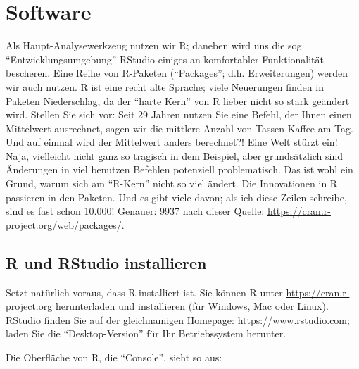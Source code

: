 \documentclass[12pt,]{book}
\begin{document}
\section{Software}\label{software}

Als Haupt-Analysewerkzeug nutzen wir R; daneben wird uns die sog.
``Entwicklungsumgebung'' RStudio einiges an komfortabler Funktionalität
bescheren. Eine Reihe von R-Paketen (``Packages''; d.h. Erweiterungen)
werden wir auch nutzen. R ist eine recht alte Sprache; viele Neuerungen
finden in Paketen Niederschlag, da der ``harte Kern'' von R lieber nicht
so stark geändert wird. Stellen Sie sich vor: Seit 29 Jahren nutzen Sie
eine Befehl, der Ihnen einen Mittelwert ausrechnet, sagen wir die
mittlere Anzahl von Tassen Kaffee am Tag. Und auf einmal wird der
Mittelwert anders berechnet?! Eine Welt stürzt ein! Naja, vielleicht
nicht ganz so tragisch in dem Beispiel, aber grundsätzlich sind
Änderungen in viel benutzen Befehlen potenziell problematisch. Das ist
wohl ein Grund, warum sich am ``R-Kern'' nicht so viel ändert. Die
Innovationen in R passieren in den Paketen. Und es gibt viele davon; als
ich diese Zeilen schreibe, sind es fast schon 10.000! Genauer: 9937 nach
dieser Quelle: \url{https://cran.r-project.org/web/packages/}.

\subsection{R und RStudio
installieren}\label{r-und-rstudio-installieren}

Setzt natürlich voraus, dass R installiert ist. Sie können R unter
\url{https://cran.r-project.org} herunterladen und installieren (für
Windows, Mac oder Linux). RStudio finden Sie auf der gleichnamigen
Homepage: \url{https://www.rstudio.com}; laden Sie die
``Desktop-Version'' für Ihr Betriebssystem herunter.

Die Oberfläche von R, die ``Console'', sieht so aus:
\end{document}
